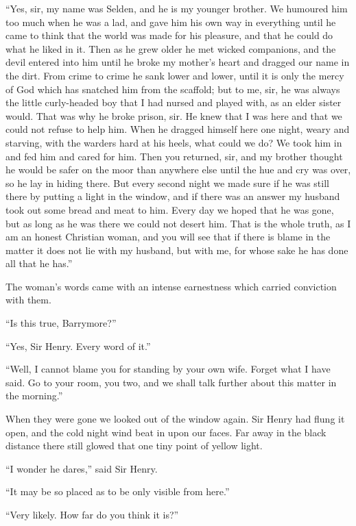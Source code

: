 \documentclass[paper=5.5in:8.5in,BCOR=7mm,twoside,DIV=calc,12pt,usegeometry,openany,chapterprefix,endperiod]{scrbook} %
\begin{document}
\enquote{Yes, sir, my name was Selden, and he is my younger brother. We humoured him too much when he was a lad, and gave him his own way in everything until he came to think that the world was made for his pleasure, and that he could do what he liked in it. Then as he grew older he met wicked companions, and the devil entered into him until he broke my mother's heart and dragged our name in the dirt. From crime to crime he sank lower and lower, until it is only the mercy of God which has snatched him from the scaffold; but to me, sir, he was always the little curly-headed boy that I had nursed and played with, as an elder sister would. That was why he broke prison, sir. He knew that I was here and that we could not refuse to help him. When he dragged himself here one night, weary and starving, with the warders hard at his heels, what could we do? We took him in and fed him and cared for him. Then you returned, sir, and my brother thought he would be safer on the moor than anywhere else until the hue and cry was over, so he lay in hiding there. But every second night we made sure if he was still there by putting a light in the window, and if there was an answer my husband took out some bread and meat to him. Every day we hoped that he was gone, but as long as he was there we could not desert him. That is the whole truth, as I am an honest Christian woman, and you will see that if there is blame in the matter it does not lie with my husband, but with me, for whose sake he has done all that he has.}

The woman's words came with an intense earnestness which carried conviction with them.

\enquote{Is this true, Barrymore?}

\enquote{Yes, Sir Henry. Every word of it.}

\enquote{Well, I cannot blame you for standing by your own wife. Forget what I have said. Go to your room, you two, and we shall talk further about this matter in the morning.}

When they were gone we looked out of the window again. Sir Henry had flung it open, and the cold night wind beat in upon our faces. Far away in the black distance there still glowed that one tiny point of yellow light.

\enquote{I wonder he dares,} said Sir Henry.

\enquote{It may be so placed as to be only visible from here.}

\enquote{Very likely. How far do you think it is?}
\end{document}
